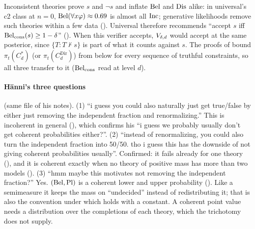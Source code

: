 \begin{remark}\label{rem:sound:belc}
Inconsistent theories prove $s$ and $\neg s$ and inflate $\mathrm{Bel}$ and $\mathrm{Dis}$ alike: in universal's c2 class at $n=0$, $\mathrm{Bel}(\forall x\varphi)\approx0.69$ is almost all $\mathrm{Inc}$; generative likelihoods remove such theories within a few data (). Universal therefore recommends ``accept $s$ iff $\mathrm{Bel}_{\mathrm{cons}}(s)\ge1-\delta$'' (). When this verifier accepts, $V_{\delta,d}$ would accept at the same posterior, since $\{T:T\nvdash s\}$ is part of what it counts against $s$. The proofs of  bound $\pi_t(C^*_d)$ (or $\pi_t(C^{\mathrm{Dir}}_d)$) from below for every sequence of truthful constraints, so all three transfer to it ($\mathrm{Bel}_{\mathrm{cons}}$ read at level $d$).
\end{remark}

\paragraph{H\"anni's three questions} (same file of his notes).
(1) ``i guess you could also naturally just get true/false by either just removing the independent fraction and renormalizing.'' This is incoherent in general (), which confirms his ``i guess we probably usually don't get coherent probabilities either?''.
(2) ``instead of renormalizing, you could also turn the independent fraction into 50/50. tho i guess this has the downside of not giving coherent probabilities usually''. Confirmed: it fails already for one theory (), and it is coherent exactly when no theory of positive mass has more than two models ().
(3) ``hmm maybe this motivates not removing the independent fraction?'' Yes. $(\mathrm{Bel},\mathrm{Pl})$ is a coherent lower and upper probability (). Like a semimeasure it keeps the mass on ``undecided'' instead of redistributing it; that is also the convention under which  holds with a constant. A coherent point value needs a distribution over the completions of each theory, which the trichotomy does not supply.
